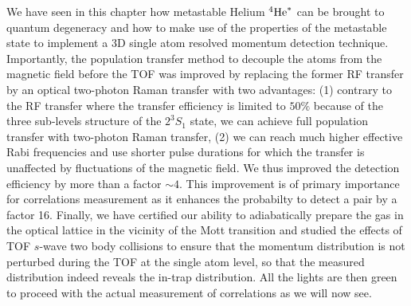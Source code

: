 We have seen in this chapter how metastable Helium $^4 \mathrm{He}^*$ can be brought to quantum degeneracy and how to make use of the properties of the metastable state to implement a 3D single atom resolved momentum detection technique. Importantly, the population transfer method to decouple the atoms from the magnetic field before the TOF was improved by replacing the former RF transfer by an optical two-photon Raman transfer with two advantages: (1) contrary to the RF transfer where the transfer efficiency is limited to $50 \%$ because of the three sub-levels structure of the $2 ^3 S_1$ state, we can achieve full population transfer with two-photon Raman transfer, (2) we can reach much higher effective Rabi frequencies and use shorter pulse durations for which the transfer is unaffected by fluctuations of the magnetic field. We thus improved the detection efficiency by more than a factor $\sim 4$. This improvement is of primary importance for \kmk correlations measurement as it enhances the probabilty to detect a \kmk pair by a factor 16. Finally, we have certified our ability to adiabatically prepare the gas in the optical lattice in the vicinity of the Mott transition and studied the effects of TOF $s$-wave two body collisions to ensure that the momentum distribution is not perturbed during the TOF at the single atom level, so that the measured distribution indeed reveals the in-trap distribution. All the lights are then green to proceed with the actual measurement of \kmk correlations as we will now see.





